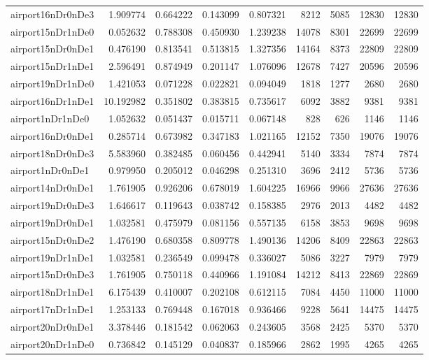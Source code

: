 \begin{longtable}{|l|r|r|r|r|r|r|r|r|}
airport16nDr0nDe3 & 1.909774 & 0.664222 & 0.143099 & 0.807321 & 8212 & 5085 & 12830 & 12830 \\
airport15nDr1nDe0 & 0.052632 & 0.788308 & 0.450930 & 1.239238 & 14078 & 8301 & 22699 & 22699 \\
airport15nDr0nDe1 & 0.476190 & 0.813541 & 0.513815 & 1.327356 & 14164 & 8373 & 22809 & 22809 \\
airport15nDr1nDe1 & 2.596491 & 0.874949 & 0.201147 & 1.076096 & 12678 & 7427 & 20596 & 20596 \\
airport19nDr1nDe0 & 1.421053 & 0.071228 & 0.022821 & 0.094049 & 1818 & 1277 & 2680 & 2680 \\
airport16nDr1nDe1 & 10.192982 & 0.351802 & 0.383815 & 0.735617 & 6092 & 3882 & 9381 & 9381 \\
airport1nDr1nDe0 & 1.052632 & 0.051437 & 0.015711 & 0.067148 & 828 & 626 & 1146 & 1146 \\
airport16nDr0nDe1 & 0.285714 & 0.673982 & 0.347183 & 1.021165 & 12152 & 7350 & 19076 & 19076 \\
airport18nDr0nDe3 & 5.583960 & 0.382485 & 0.060456 & 0.442941 & 5140 & 3334 & 7874 & 7874 \\
airport1nDr0nDe1 & 0.979950 & 0.205012 & 0.046298 & 0.251310 & 3696 & 2412 & 5736 & 5736 \\
airport14nDr0nDe1 & 1.761905 & 0.926206 & 0.678019 & 1.604225 & 16966 & 9966 & 27636 & 27636 \\
airport19nDr0nDe3 & 1.646617 & 0.119643 & 0.038742 & 0.158385 & 2976 & 2013 & 4482 & 4482 \\
airport19nDr0nDe1 & 1.032581 & 0.475979 & 0.081156 & 0.557135 & 6158 & 3853 & 9698 & 9698 \\
airport15nDr0nDe2 & 1.476190 & 0.680358 & 0.809778 & 1.490136 & 14206 & 8409 & 22863 & 22863 \\
airport19nDr1nDe1 & 1.032581 & 0.236549 & 0.099478 & 0.336027 & 5086 & 3227 & 7979 & 7979 \\
airport15nDr0nDe3 & 1.761905 & 0.750118 & 0.440966 & 1.191084 & 14212 & 8413 & 22869 & 22869 \\
airport18nDr1nDe1 & 6.175439 & 0.410007 & 0.202108 & 0.612115 & 7084 & 4450 & 11000 & 11000 \\
airport17nDr1nDe1 & 1.253133 & 0.769448 & 0.167018 & 0.936466 & 9228 & 5641 & 14475 & 14475 \\
airport20nDr0nDe1 & 3.378446 & 0.181542 & 0.062063 & 0.243605 & 3568 & 2425 & 5370 & 5370 \\
airport20nDr1nDe0 & 0.736842 & 0.145129 & 0.040837 & 0.185966 & 2862 & 1995 & 4265 & 4265 \\

\end{longtable}
